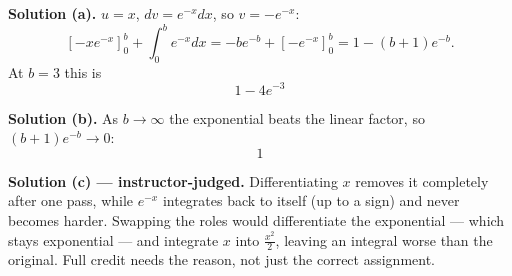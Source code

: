 \documentclass[12pt]{article}
\begin{document}

\textbf{Solution (a).} $u = x$, $dv = e^{-x}dx$, so $v = -e^{-x}$:
\[ \left[-xe^{-x}\right]_0^{b} + \int_0^{b}e^{-x}dx
   = -be^{-b} + \left[-e^{-x}\right]_0^{b} = 1 - (b+1)e^{-b}. \]
At $b = 3$ this is
\[ \boxed{1 - 4e^{-3}} \]

\textbf{Solution (b).} As $b \rightarrow \infty$ the exponential beats the
linear factor, so $(b+1)e^{-b} \rightarrow 0$:
\[ \boxed{1} \]

\textbf{Solution (c) --- instructor-judged.} Differentiating $x$ removes it
completely after one pass, while $e^{-x}$ integrates back to itself (up to a
sign) and never becomes harder. Swapping the roles would differentiate the
exponential --- which stays exponential --- and integrate $x$ into
$\tfrac{x^2}{2}$, leaving an integral worse than the original. Full credit needs
the reason, not just the correct assignment.
\end{document}
